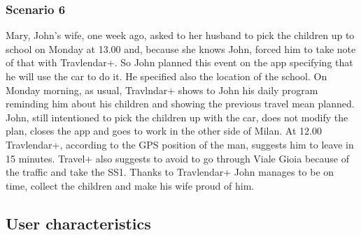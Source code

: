 	\subsubsection{Scenario 6}
		Mary, John's wife, one week ago, asked to her husband to pick the children up to school on Monday at 13.00 and, because she knows John,  forced him to take note of that with Travlendar+.\newline
		So John planned this event on the app specifying that he will use the car to do it.
		He specified also the location of the school.\newline
		On Monday morning, as usual, Travlndar+ shows to John his daily program reminding him about his children and showing the previous  travel mean planned.\newline
		John, still intentioned to pick the children up with the car, does not modify the plan, closes the app and goes to work in the other side of Milan.\newline
		At 12.00 Travlendar+, according to the GPS position of the man, suggests him to leave in 15 minutes.
		Travel+ also suggests to avoid to go through  Viale Gioia because of the traffic and take the SS1.\newline
		Thanks to Travlendar+ John manages to be on time, collect the children and make his wife proud of him. 
\subsection{User characteristics}
